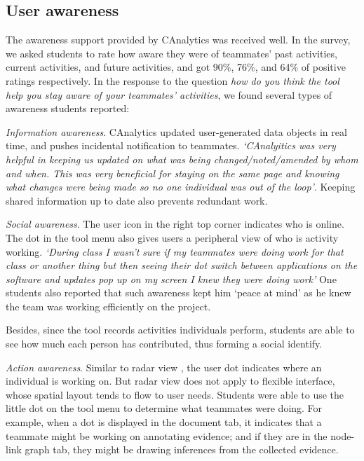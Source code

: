 \subsection{User awareness}

The awareness support provided by CAnalytics was received well. In the survey, we asked students to rate how aware they were of teammates' past activities, current activities, and future activities, and got 90\%, 76\%, and 64\% of positive ratings respectively. 
In the response to the question \textit{how do you think the tool help you stay aware of your teammates' activities}, we found several types of awareness students reported:

\textit{Information awareness}. %
CAnalytics updated user-generated data objects in real time, and pushes incidental notification to teammates. 
\textit{`CAnalyitics was very helpful in keeping us updated on what was being changed/noted/amended by whom and when. This was very beneficial for staying on the same page and knowing what changes were being made so no one individual was out of the loop'}. Keeping shared information up to date also prevents redundant work. 

\textit{Social awareness}.  %
The user icon in the right top corner indicates who is online. The dot in the tool menu also gives users a peripheral view of who is activity working. 
\textit{`During class I wasn't sure if my teammates were doing work for that class or another thing but then seeing their dot switch between applications on the software and updates pop up on my screen I knew they were doing work'}
One students also reported that such awareness kept him `peace at mind' as he knew the team was working efficiently on the project. 

Besides, since the tool records activities individuals perform, students are able to see how much each person has contributed, thus forming a social identify.

\textit{Action awareness}.  %
Similar to radar view \cite{Gutwin1996}, the user dot indicates where an individual is working on. But radar view does not apply to flexible interface, whose spatial layout tends to flow to user needs. Students were able to use the little dot on the tool menu to determine what teammates were doing. For example, when a dot is displayed in the document tab, it indicates that a teammate might be working on annotating evidence; and if they are in the node-link graph tab, they might be drawing inferences from the collected evidence.

